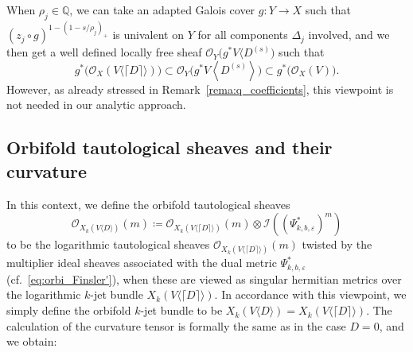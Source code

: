 \documentclass[AHL,Unicode,longabstracts,published]{cedram}
\newcommand*\cI{\mathcal{I}}
\newcommand*\cO{\mathcal{O}}
\newcommand*\bQ{\mathbb{Q}}
\newcommand*\bydef{\coloneqq}
\begin{document}
\begin{rema}
When $\rho_j\in\bQ$, we can take an adapted Galois cover $g\colon Y\to X$ such that $(z_j\circ g)^{1-(1-s/\rho_j)_+}$ is univalent on $Y$ for all components $\Delta_j$ involved, and we then get a well defined locally free sheaf $\cO_Y\big(g^*V\langle D^{(s)}\big)$ such that
\[
g^*\big(\cO_X(V\langle\lceil D\rceil\rangle)\big)\subset
\cO_Y\big(g^*V\left\langle D^{(s)}\right\rangle\big)\subset g^*\big(\cO_X(V)\big).
\]
However, as already stressed in Remark~\ref{rema:q_coefficients}, this viewpoint is not needed in our analytic approach.
\end{rema}

\subsection{Orbifold tautological sheaves and their curvature} In this context, we define the orbifold tautological sheaves
\[
\cO_{X_k(V\langle D\rangle)}(m)
\bydef
\cO_{X_k(V\langle\lceil D\rceil\rangle)}(m)\otimes
\cI((\Psi_{k,b,\varepsilon}^*)^m)
\]
to be the logarithmic tautological sheaves $\cO_{X_k(V\langle\lceil D\rceil\rangle)}(m)$ twisted by the multiplier ideal sheaves associated with the dual metric $\Psi_{k,b,\varepsilon}^*$ (cf.~\eqref{eq:orbi_Finsler'}), when these are viewed as singular hermitian metrics over the logarithmic
$k$-jet bundle $X_k(V\langle\lceil D\rceil\rangle)$. In accordance with this viewpoint, we simply define the orbifold $k$-jet bundle to be
$X_k(V\langle D\rangle)=X_k(V\langle\lceil D\rceil\rangle)$. The calculation of the curvature tensor is formally the same as in the case
$D=0$, and we obtain:
\end{document}
